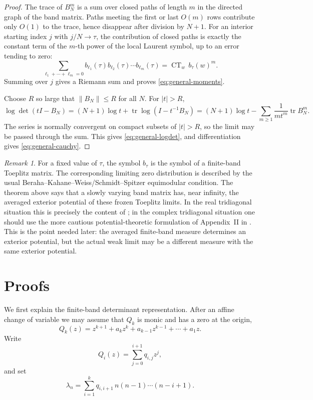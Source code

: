 \documentclass[10pt,twoside,a4paper,reqno]{amsart}
\theoremstyle{plain}
\theoremstyle{definition}
\theoremstyle{remark}
\newtheorem{rem}             {Remark}
\newenvironment{remark}{\begin{rem}}{\end{rem}}
\newcommand {\CT} {\operatorname {CT}}
\begin{document}
\begin{proof}
The trace of $B_N^m$ is a sum over closed paths of length $m$ in the directed graph of the band matrix.  Paths meeting the first or last $O(m)$ rows contribute only $O(1)$ to the trace, hence disappear after division by $N+1$.  For an interior starting index $j$ with $j/N\to\tau$, the contribution of closed paths is exactly the constant term of the $m$-th power of the local Laurent symbol, up to an error tending to zero:
\[
        \sum_{\ell_1+\cdots+\ell_m=0}
        b_{\ell_1}(\tau)b_{\ell_2}(\tau)\cdots b_{\ell_m}(\tau)
        =\CT_w\, b_\tau(w)^m .
\]
Summing over $j$ gives a Riemann sum and proves \eqref{eq:general-moments}.

Choose $R$ so large that $\|B_N\|\le R$ for all $N$.  For $|t|>R$,
\[
        \log\det(tI-B_N)
        =(N+1)\log t+
        \operatorname{tr}\log(I-t^{-1}B_N)
        =(N+1)\log t-
        \sum_{m\ge 1}\frac{1}{m t^m}\operatorname{tr}B_N^m .
\]
The series is normally convergent on compact subsets of $|t|>R$, so the limit may be passed through the sum.  This gives \eqref{eq:general-logdet}, and differentiation gives \eqref{eq:general-cauchy}.
\end{proof}

\begin{remark}
For a fixed value of $\tau$, the symbol $b_\tau$ is the symbol of a finite-band Toeplitz matrix.  The corresponding limiting zero distribution is described by the usual Beraha--Kahane--Weiss/Schmidt--Spitzer equimodular condition.  The theorem above says that a slowly varying band matrix has, near infinity, the averaged exterior potential of these frozen Toeplitz limits.  In the real tridiagonal situation this is precisely the content of \cite{KvA}; in the complex tridiagonal situation one should use the more cautious potential-theoretic formulation of Appendix~II in \cite{ShTquartic}.  This is the point needed later: the averaged finite-band measure determines an exterior potential, but the actual weak limit may be a different measure with the same exterior potential.
\end{remark}

    
\section{Proofs} \label{Proofs}

We first explain the finite-band determinant representation.  After an affine change of variable we may assume that $Q_k$ is monic and has a zero at the origin,
\[
Q_k(z)=z^{k+1}+a_kz^k+a_{k-1}z^{k-1}+\cdots+a_1z .
\]
Write
\[
        Q_i(z)=\sum_{j=0}^{i+1}q_{i,j}z^j,
\]
and set
\[
        \lambda_n=\sum_{i=1}^k q_{i,i+1}\,n(n-1)\cdots(n-i+1).
\]
\end{document}
